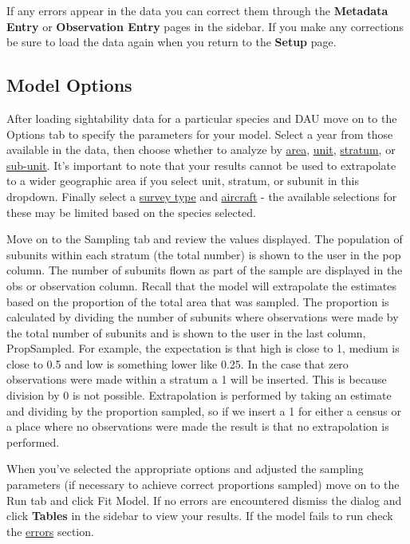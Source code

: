 \documentclass[
]{book}
\begin{document}
If any errors appear in the data you can correct them through the \textbf{Metadata Entry} or \textbf{Observation Entry} pages in the sidebar. If you make any corrections be sure to load the data again when you return to the \textbf{Setup} page.

\hypertarget{sight-options}{%
\subsection{Model Options}\label{sight-options}}

After loading sightability data for a particular species and DAU move on to the Options tab to specify the parameters for your model. Select a year from those available in the data, then choose whether to analyze by \protect\hyperlink{gl-area}{area}, \protect\hyperlink{gl-unit}{unit}, \protect\hyperlink{gl-stratum}{stratum}, or \protect\hyperlink{gl-subunit}{sub-unit}. It's important to note that your results cannot be used to extrapolate to a wider geographic area if you select unit, stratum, or subunit in this dropdown. Finally select a \protect\hyperlink{gl-sight-survey}{survey type} and \protect\hyperlink{gl-aircraft}{aircraft} - the available selections for these may be limited based on the species selected.

Move on to the Sampling tab and review the values displayed. The population of subunits within each stratum (the total number) is shown to the user in the pop column. The number of subunits flown as part of the sample are displayed in the obs or observation column. Recall that the model will extrapolate the estimates based on the proportion of the total area that was sampled. The proportion is calculated by dividing the number of subunits where observations were made by the total number of subunits and is shown to the user in the last column, PropSampled. For example, the expectation is that high is close to 1, medium is close to 0.5 and low is something lower like 0.25. In the case that zero observations were made within a stratum a 1 will be inserted. This is because division by 0 is not possible. Extrapolation is performed by taking an estimate and dividing by the proportion sampled, so if we insert a 1 for either a census or a place where no observations were made the result is that no extrapolation is performed.

When you've selected the appropriate options and adjusted the sampling parameters (if necessary to achieve correct proportions sampled) move on to the Run tab and click {Fit Model}. If no errors are encountered dismiss the dialog and click \textbf{Tables} in the sidebar to view your results. If the model fails to run check the \protect\hyperlink{sight-errors}{errors} section.
\end{document}
